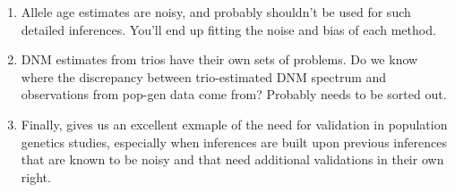 \documentclass[]{article}
\begin{document}
\begin{enumerate}
    \item Allele age estimates are noisy, and probably shouldn't be used
        for such detailed inferences. You'll end up fitting the noise and
        bias of each method.
    \item DNM estimates from trios have their own sets of problems. Do we
        know where the discrepancy between trio-estimated DNM spectrum and
        observations from pop-gen data come from? Probably needs to be
        sorted out.
    \item Finally, \citet{wang2023human} gives us an excellent exmaple of the
        need for validation in population genetics studies, especially when
        inferences are built upon previous inferences that are known to be
        noisy and that need additional validations in their own right.
\end{enumerate}



\end{document}
